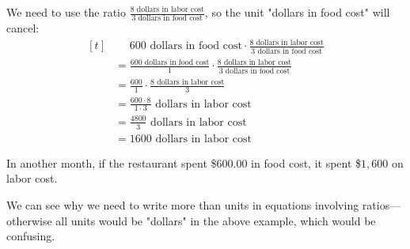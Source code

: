 \begin{solution}
\begin{enumerate}
We need to use the ratio $\frac{8 \text{ dollars in labor cost}}{3 \text{ dollars in food cost}}$, so the unit "dollars in food cost" will cancel:
\[
\begin{aligned}[t]
	&\phantom{{}=}600 \text{ dollars in food cost} \cdot \frac{8 \text{ dollars in labor cost}}{3 \text{ dollars in food cost}} \\
	&= \frac{600 \text{ dollars in food cost}}{1} \cdot \frac{8 \text{ dollars in labor cost}}{3 \text{ dollars in food cost}} \\
	&= \frac{600}{1} \cdot \frac{8 \text{ dollars in labor cost}}{3} \\
	&= \frac{600\cdot8}{1\cdot3} \text{ dollars in labor cost} \\
	&= \frac{4800}{3} \text{ dollars in labor cost} \\
	&= 1600 \text{ dollars in labor cost}
\end{aligned}
\]

In another month, if the restaurant spent \$$600.00$ in food cost, it spent \$$1,600$ on labor cost.
\end{enumerate}
\end{solution}

We can see why we need to write more than units in equations involving ratios---otherwise all units would be "dollars" in the above example, which would be confusing.

